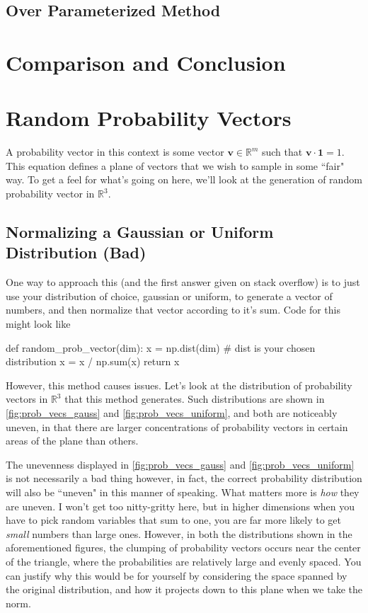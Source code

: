 \documentclass{paper}[11pt]
\newcommand{\bv}[1]{\textbf{#1}}
\begin{document}
	\subsection{Over Parameterized Method}
	\section{Comparison and Conclusion}
	
	
	\appendix
	\section{Random Probability Vectors}\label{apdx:random probability vectors}
	
	A probability vector in this context is some vector $\bv{v}\in\mathbb{R}^m$ such that $\bv{v}\cdot\bv{1}=1$. This equation defines a plane of vectors that we wish to sample in some ``fair" way. To get a feel for what's going on here, we'll look at the generation of random probability vector in $\mathbb{R}^3$.
	
	\subsection{Normalizing a Gaussian or Uniform Distribution (Bad)}
	
	One way to approach this (and the first answer given on stack overflow) is to just use your distribution of choice, gaussian or uniform, to generate a vector of numbers, and then normalize that vector according to it's sum. Code for this might look like
	\begin{verbatimtab}
		def random_prob_vector(dim):
			x = np.dist(dim) # dist is your chosen distribution
			x = x / np.sum(x)
			return x
	\end{verbatimtab}
	However, this method causes issues. Let's look at the distribution of probability vectors in $\mathbb{R}^3$ that this method generates. Such distributions are shown in \cref{fig:prob_vecs_gauss} and \cref{fig:prob_vecs_uniform}, and both are noticeably uneven, in that there are larger concentrations of probability vectors in certain areas of the plane than others.
	
	The unevenness displayed in \cref{fig:prob_vecs_gauss} and \cref{fig:prob_vecs_uniform} is not necessarily a bad thing however, in fact, the correct probability distribution will also be ``uneven" in this manner of speaking. What matters more is \textit{how} they are uneven. I won't get too nitty-gritty here, but in higher dimensions when you have to pick random variables that sum to one, you are far more likely to get \textit{small} numbers than large ones. However, in both the distributions shown in the aforementioned figures, the clumping of probability vectors occurs near the center of the triangle, where the probabilities are relatively large and evenly spaced. You can justify why this would be for yourself by considering the space spanned by the original distribution, and how it projects down to this plane when we take the norm.
	
\end{document}
